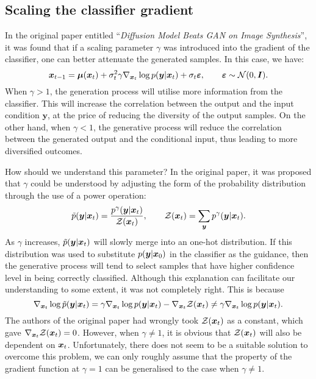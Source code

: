 \subsection{Scaling the classifier gradient}
In the original paper entitled ``\emph{Diffusion Model Beats GAN on Image Synthesis}'', it was found that if a scaling parameter $\gamma$ was introduced into the gradient of the classifier, one can better attenuate the generated samples. In this case, we have:
\begin{equation}
    \label{eq:9.8}
    \bm{x}_{t-1}=\bm{\mu}(\bm{x}_{t})+\sigma_t^2\gamma\nabla_{\bm{x}_{t}}\log p(\bm{y}|\bm{x}_{t})+\sigma_t\bm{\varepsilon},\qquad \bm{\varepsilon}\sim\mathcal{N}(0,\bm{I}).
\end{equation}
When $\gamma>1$, the generation process will utilise more information from the classifier. This will increase the correlation between the output and the input condition $\bm{y}$, at the price of reducing the diversity of the output samples. On the other hand, when $\gamma<1$, the generative process will reduce the correlation between the generated output and the conditional input, thus leading to  more diversified outcomes. 

How should we understand this parameter? In the original paper, it was proposed that $\gamma$ could be understood by adjusting the form of the probability distribution through the use of a power operation:
\begin{equation}
    \label{eq:9.9}
    \tilde{p}(\bm{y}|\bm{x}_{t})=\frac{p^{\gamma}(\bm{y}|\bm{x}_{t})}{\mathcal{Z}(\bm{x}_{t})},\qquad \mathcal{Z}(\bm{x}_{t})=\sum_{\bm{y}}p^{\gamma}(\bm{y}|\bm{x}_{t}).
\end{equation}
As $\gamma$ increases, $ \tilde{p}(\bm{y}|\bm{x}_{t})$ will slowly merge into an one-hot distribution. If this distribution was used to substitute $p(\bm{y}|\bm{x}_0)$ in the classifier as the guidance, then the generative process will tend to select samples that have higher confidence level in being correctly classified. Although this explanation can facilitate our understanding to some extent, it was  not completely right. This is because
\begin{equation}
    \label{eq:9.10}
    \nabla_{\bm{x}_{t}}\log \tilde{p}(\bm{y}|\bm{x}_{t})=\gamma\nabla_{\bm{x}_{t}}\log p(\bm{y}|\bm{x}_{t})-\nabla_{\bm{x}_{t}}\mathcal{Z}(\bm{x}_{t})\neq \gamma\nabla_{\bm{x}_{t}}\log p(\bm{y}|\bm{x}_{t}).
\end{equation}
The authors of the original paper had wrongly took $\mathcal{Z}(\bm{x}_{t})$ as a constant, which gave $\nabla_{\bm{x}_{t}}\mathcal{Z}(\bm{x}_{t})=0$. However, when $\gamma\neq 1$, it is obvious that $\mathcal{Z}(\bm{x}_{t})$ will also be dependent on $\bm{x}_{t}$. Unfortunately, there does not seem to be a suitable solution to  overcome this problem, we can only roughly assume that the property of the gradient function at $\gamma=1$ can be generalised to the case when $\gamma\neq 1$.


